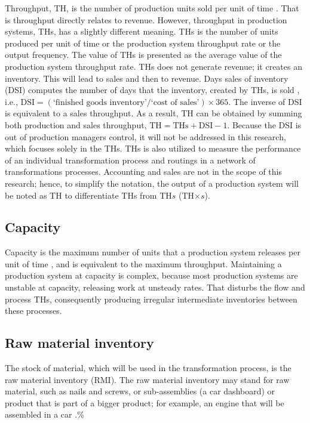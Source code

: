 \documentclass{article}
\begin{document}
Throughput, TH, is the number of production units sold per unit of time \citep[p.216]{Hopp2001}.
That is throughput directly relates to revenue.
However, throughput in production systems, THs, has a slightly different meaning.
THs is the number of units produced per unit of time or the production system throughput rate or the output frequency.
The value of THs is presented as the average value of the production system throughput rate.
THs does not generate revenue; it creates an inventory.
This will lead to sales and then to revenue.
Days sales of inventory (DSI) computes the number of days that the inventory, created by THs, is sold \citep{Marshall2014}, i.e., \(\mbox{DSI}=(\mbox{`finished goods inventory'}/\mbox{`cost of sales'}) \times 365\).
The inverse of DSI is equivalent to a sales throughput.
As a result, TH can be obtained by summing both production and sales throughput, \(\mbox{TH}=\mbox{THs}+\mbox{DSI}-1\).
Because the DSI is out of production managers control, it will not be addressed in this research, which focuses solely in the THs.
THs is also utilized to measure the performance of an individual transformation process and routings in a network of transformations processes.
Accounting and sales are not in the scope of this research; hence, to simplify the notation, the output of a production system will be noted as TH to differentiate THs from TH\(s\) (TH\(\times s\)).

\subsection{Capacity}

Capacity is the maximum number of units that a production system releases per unit of time \citep{Hopp2001}, and is equivalent to the maximum throughput.
Maintaining a production system at capacity is complex, because most production systems are unstable at capacity, releasing work at unsteady rates.
That disturbs the flow and process THs, consequently producing irregular intermediate inventories between these processes.

\subsection{Raw material inventory}

The stock of material, which will be used in the transformation process, is the raw material inventory (RMI).
The raw material inventory may stand for raw material, such as nails and screws, or sub-assemblies (a car dashboard) or product that is part of a bigger product; for example, an engine that will be assembled in a car \citep{Hopp2001}.\%\citep[p.217]{Hopp2001}
\end{document}
